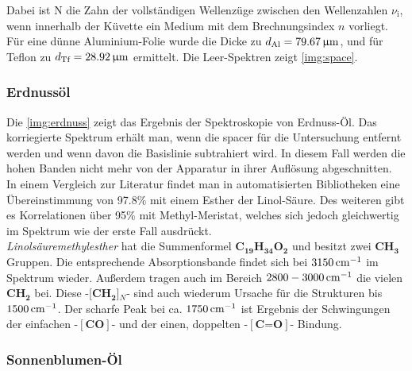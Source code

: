\documentclass[numbers=noenddot,a4paper,10pt,twocolumn]{article}
\newcommand{\ix}[1]{_\text{#1}}
\newcommand{\tilt}[1]{\textit{#1}}
\newcommand{\fett}[1]{\textbf{#1}}
\begin{document}
		Dabei ist N die Zahn der vollst\"andigen Wellenz\"uge zwischen den Wellenzahlen $\nu\ix{i}$, wenn innerhalb der K\"uvette ein Medium mit dem Brechnungsindex $n$ vorliegt. F\"ur eine d\"unne Aluminium-Folie wurde die Dicke zu $d\ix{Al}=\unit[79.67]{\upmu m}$, und f\"ur Teflon zu $d\ix{Tf}=\unit[28.92]{\upmu m}$ ermittelt. Die Leer-Spektren zeigt \autoref{img:space}.

		\subsubsection*{Erdnuss\"ol}

		Die \autoref{img:erdnuss} zeigt das Ergebnis der Spektroskopie von Erdnuss-\"Ol. Das korriegierte Spektrum erh\"alt man, wenn die spacer f\"ur die Untersuchung entfernt werden und wenn davon die Basislinie subtrahiert wird. In diesem Fall werden die hohen Banden nicht mehr von der Apparatur in ihrer Aufl\"osung abgeschnitten.\\
		In einem Vergleich zur Literatur findet man in automatisierten Bibliotheken eine \"Ubereinstimmung von 97.8\% mit einem Esther der Linol-S\"aure. Des weiteren gibt es Korrelationen \"uber 95\% mit Methyl-Meristat, welches sich jedoch gleichwertig im Spektrum wie der erste Fall ausdr\"uckt.\\
		\tilt{Linols\"auremethylesther} hat die Summenformel \fett{C}$_{\fett{19}}$\fett{H}$_{\fett{34}}$\fett{O}$_{\fett{2}}$ und besitzt zwei \fett{CH}$_{\fett{3}}$ Gruppen. Die entsprechende Absorptionsbande findet sich bei $\unit[3150]{cm^{-1}}$ im Spektrum wieder. Au{\ss}erdem tragen auch im Bereich $\unit[2800-3000]{cm^{-1}}$ die vielen \fett{CH}$_{\fett{2}}$ bei. Diese -[\fett{CH}$_{\fett{2}}$]$_{N}$- sind auch wiederum Ursache f\"ur die Strukturen bis $\unit[1500]{cm^{-1}}$. Der scharfe Peak bei ca. $\unit[1750]{cm^{-1}}$ ist Ergebnis der Schwingungen der einfachen -$[\fett{CO}]$- und der einen, doppelten -$[\fett{C=O}]$- Bindung.
		
		\subsubsection*{Sonnenblumen-\"Ol}
		
\end{document}
